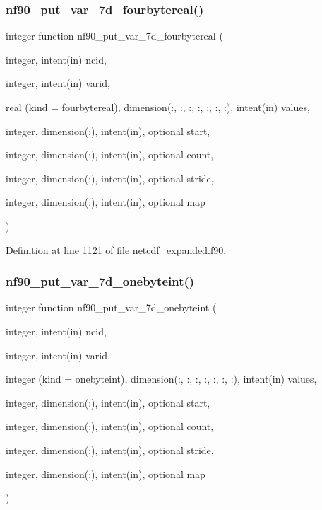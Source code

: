 \subsubsection{\texorpdfstring{nf90\+\_\+put\+\_\+var\+\_\+7d\+\_\+fourbytereal()}{nf90\_put\_var\_7d\_fourbytereal()}}
{\footnotesize\ttfamily integer function nf90\+\_\+put\+\_\+var\+\_\+7d\+\_\+fourbytereal (\begin{DoxyParamCaption}\item[{integer, intent(in)}]{ncid,  }\item[{integer, intent(in)}]{varid,  }\item[{real (kind = fourbytereal), dimension(\+:, \+:, \+:, \+:, \+:, \+:, \+:), intent(in)}]{values,  }\item[{integer, dimension(\+:), intent(in), optional}]{start,  }\item[{integer, dimension(\+:), intent(in), optional}]{count,  }\item[{integer, dimension(\+:), intent(in), optional}]{stride,  }\item[{integer, dimension(\+:), intent(in), optional}]{map }\end{DoxyParamCaption})}



Definition at line 1121 of file netcdf\+\_\+expanded.\+f90.

\mbox{\label{netcdf__expanded_8f90_a478211fe41a0dd55c0cfe0abe6f6a6d4}} 
\subsubsection{\texorpdfstring{nf90\+\_\+put\+\_\+var\+\_\+7d\+\_\+onebyteint()}{nf90\_put\_var\_7d\_onebyteint()}}
{\footnotesize\ttfamily integer function nf90\+\_\+put\+\_\+var\+\_\+7d\+\_\+onebyteint (\begin{DoxyParamCaption}\item[{integer, intent(in)}]{ncid,  }\item[{integer, intent(in)}]{varid,  }\item[{integer (kind = onebyteint), dimension(\+:, \+:, \+:, \+:, \+:, \+:, \+:), intent(in)}]{values,  }\item[{integer, dimension(\+:), intent(in), optional}]{start,  }\item[{integer, dimension(\+:), intent(in), optional}]{count,  }\item[{integer, dimension(\+:), intent(in), optional}]{stride,  }\item[{integer, dimension(\+:), intent(in), optional}]{map }\end{DoxyParamCaption})}



